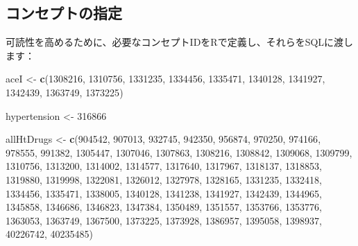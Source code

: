 \documentclass[
  11pt]{book}
\newenvironment{Shaded}{\begin{snugshade}}{\end{snugshade}}
\newcommand{\DecValTok}[1]{\textcolor[rgb]{0.00,0.00,0.81}{#1}}
\newcommand{\FunctionTok}[1]{\textcolor[rgb]{0.13,0.29,0.53}{\textbf{#1}}}
\newcommand{\NormalTok}[1]{#1}
\newcommand{\OtherTok}[1]{\textcolor[rgb]{0.56,0.35,0.01}{#1}}
\theoremstyle{definition}
\theoremstyle{definition}
\theoremstyle{definition}
\theoremstyle{definition}
\theoremstyle{remark}
\begin{document}
\subsection{コンセプトの指定}\label{ux30b3ux30f3ux30bbux30d7ux30c8ux306eux6307ux5b9a}

可読性を高めるために、必要なコンセプトIDをRで定義し、それらをSQLに渡します：

\begin{Shaded}
\begin{Highlighting}[]
\NormalTok{aceI }\OtherTok{\textless{}{-}} \FunctionTok{c}\NormalTok{(}\DecValTok{1308216}\NormalTok{, }\DecValTok{1310756}\NormalTok{, }\DecValTok{1331235}\NormalTok{, }\DecValTok{1334456}\NormalTok{, }\DecValTok{1335471}\NormalTok{, }\DecValTok{1340128}\NormalTok{, }\DecValTok{1341927}\NormalTok{,}
          \DecValTok{1342439}\NormalTok{, }\DecValTok{1363749}\NormalTok{, }\DecValTok{1373225}\NormalTok{)}

\NormalTok{hypertension }\OtherTok{\textless{}{-}} \DecValTok{316866}

\NormalTok{allHtDrugs }\OtherTok{\textless{}{-}} \FunctionTok{c}\NormalTok{(}\DecValTok{904542}\NormalTok{, }\DecValTok{907013}\NormalTok{, }\DecValTok{932745}\NormalTok{, }\DecValTok{942350}\NormalTok{, }\DecValTok{956874}\NormalTok{, }\DecValTok{970250}\NormalTok{, }\DecValTok{974166}\NormalTok{,}
                  \DecValTok{978555}\NormalTok{, }\DecValTok{991382}\NormalTok{, }\DecValTok{1305447}\NormalTok{, }\DecValTok{1307046}\NormalTok{, }\DecValTok{1307863}\NormalTok{, }\DecValTok{1308216}\NormalTok{,}
                  \DecValTok{1308842}\NormalTok{, }\DecValTok{1309068}\NormalTok{, }\DecValTok{1309799}\NormalTok{, }\DecValTok{1310756}\NormalTok{, }\DecValTok{1313200}\NormalTok{, }\DecValTok{1314002}\NormalTok{,}
                  \DecValTok{1314577}\NormalTok{, }\DecValTok{1317640}\NormalTok{, }\DecValTok{1317967}\NormalTok{, }\DecValTok{1318137}\NormalTok{, }\DecValTok{1318853}\NormalTok{, }\DecValTok{1319880}\NormalTok{,}
                  \DecValTok{1319998}\NormalTok{, }\DecValTok{1322081}\NormalTok{, }\DecValTok{1326012}\NormalTok{, }\DecValTok{1327978}\NormalTok{, }\DecValTok{1328165}\NormalTok{, }\DecValTok{1331235}\NormalTok{,}
                  \DecValTok{1332418}\NormalTok{, }\DecValTok{1334456}\NormalTok{, }\DecValTok{1335471}\NormalTok{, }\DecValTok{1338005}\NormalTok{, }\DecValTok{1340128}\NormalTok{, }\DecValTok{1341238}\NormalTok{,}
                  \DecValTok{1341927}\NormalTok{, }\DecValTok{1342439}\NormalTok{, }\DecValTok{1344965}\NormalTok{, }\DecValTok{1345858}\NormalTok{, }\DecValTok{1346686}\NormalTok{, }\DecValTok{1346823}\NormalTok{,}
                  \DecValTok{1347384}\NormalTok{, }\DecValTok{1350489}\NormalTok{, }\DecValTok{1351557}\NormalTok{, }\DecValTok{1353766}\NormalTok{, }\DecValTok{1353776}\NormalTok{, }\DecValTok{1363053}\NormalTok{,}
                  \DecValTok{1363749}\NormalTok{, }\DecValTok{1367500}\NormalTok{, }\DecValTok{1373225}\NormalTok{, }\DecValTok{1373928}\NormalTok{, }\DecValTok{1386957}\NormalTok{, }\DecValTok{1395058}\NormalTok{,}
                  \DecValTok{1398937}\NormalTok{, }\DecValTok{40226742}\NormalTok{, }\DecValTok{40235485}\NormalTok{)}
\end{Highlighting}
\end{Shaded}
\end{document}
